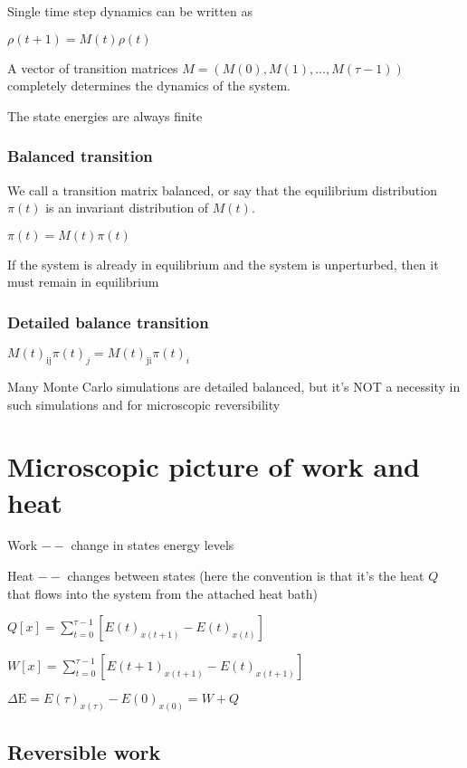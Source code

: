 \documentclass{article}
\begin{document}
Single time step dynamics can be written as

\(\rho (t+1)=M(t)\rho (t)\)

A vector of transition matrices \(M=(M(0),M(1),\ldots ,M(\tau -1))\) completely determines the dynamics of the system.

The state energies are always finite

\subsubsection*{Balanced transition}

We call a transition matrix balanced, or say that the equilibrium distribution \(\pi (t)\) is an invariant distribution of \(M(t)\).

\(\pi (t)=M(t)\pi (t)\)

If the system is already in equilibrium and the system is unperturbed, then it must remain in equilibrium

\subsubsection*{Detailed balance transition}

\(M(t)_{\text{ij}}\pi (t)_j=M(t)_{\text{ji}}\pi (t)_i\)

Many Monte Carlo simulations are detailed balanced, but it{'}s NOT a necessity in such simulations and for microscopic reversibility

\section*{Microscopic picture of work and heat}

Work $--$ change in states energy levels

Heat $--$ changes between states (here the convention is that it{'}s the heat \(Q\) that flows into the system from the attached heat bath)

\(Q[x]=\sum _{t=0}^{\tau -1} \left[E(t)_{x(t+1)}-E(t)_{x(t)}\right]\)

\(W[x]=\sum _{t=0}^{\tau -1} \left[E(t+1)_{x(t+1)}-E(t)_{x(t+1)}\right]\)

\(\text{$\Delta $E}=E(\tau )_{x(\tau )}-E(0)_{x(0)}=W+Q\)

\subsection*{Reversible work}
\end{document}
